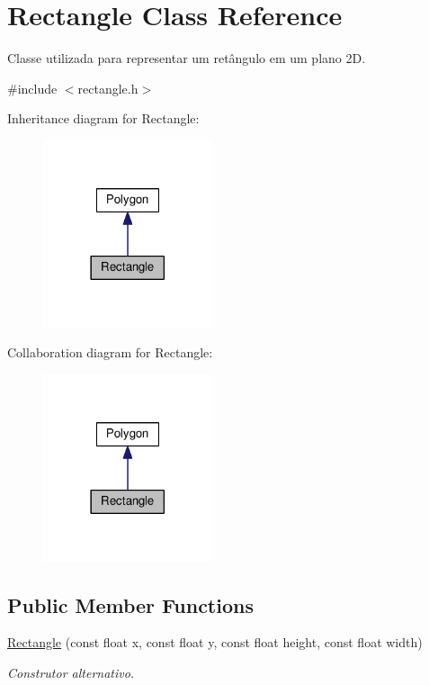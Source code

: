 \hypertarget{class_rectangle}{}\section{Rectangle Class Reference}
\label{class_rectangle}


Classe utilizada para representar um retângulo em um plano 2D.  




{\ttfamily \#include $<$rectangle.\+h$>$}



Inheritance diagram for Rectangle\+:\nopagebreak
\begin{figure}[H]
\begin{center}
\leavevmode
\includegraphics[width=141pt]{class_rectangle__inherit__graph}
\end{center}
\end{figure}


Collaboration diagram for Rectangle\+:\nopagebreak
\begin{figure}[H]
\begin{center}
\leavevmode
\includegraphics[width=141pt]{class_rectangle__coll__graph}
\end{center}
\end{figure}
\subsection*{Public Member Functions}
\begin{DoxyCompactItemize}
\item 
\hyperlink{class_rectangle_a6772c2d54103b5f097e1c5ac62a87f4e}{Rectangle} (const float x, const float y, const float height, const float width)
\begin{DoxyCompactList}\small\item\em Construtor alternativo. \end{DoxyCompactList}\end{DoxyCompactItemize}
